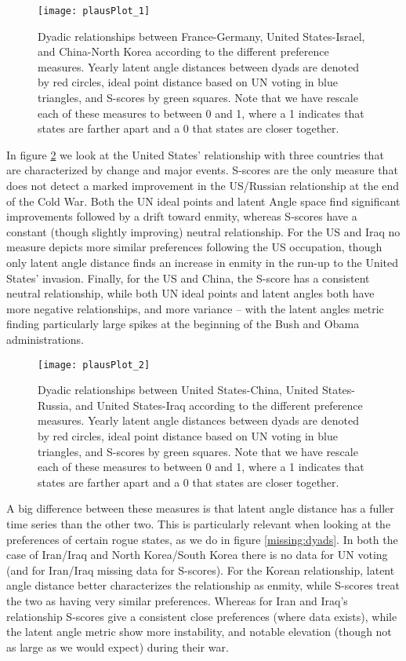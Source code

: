 \begin{figure}
	\centering
	\texttt{[image: plausPlot\_1]}
	\caption{Dyadic relationships between France-Germany, United States-Israel, and China-North Korea according to the different preference measures. Yearly latent angle distances between dyads are denoted by red circles, ideal point distance based on UN voting in blue triangles, and S-scores by green squares. Note that we have rescale each of these measures to between 0 and 1, where a 1 indicates that states are farther apart and a 0 that states are closer together.}
	\label{friendly:dyads}
\end{figure}

In figure \ref{unfriendly:dyads} we look at the United States' relationship with three countries that are characterized by change and major events. S-scores are the only measure that does not detect a marked improvement in the US/Russian relationship at the end of the Cold War. Both the UN ideal points and latent Angle space find significant improvements followed by a drift toward enmity, whereas S-scores have a constant (though slightly improving) neutral relationship. For the US and Iraq no measure depicts more similar preferences following the US occupation, though only latent angle distance finds an increase in enmity in the run-up to the United States' invasion. Finally, for the US and China, the S-score has a consistent neutral relationship, while both UN ideal points and latent angles both have more negative relationships, and more variance -- with the latent angles metric finding particularly large spikes at the beginning of the Bush and Obama administrations.

\begin{figure}
	\centering
	\texttt{[image: plausPlot\_2]}
	\caption{Dyadic relationships between United States-China, United States-Russia, and United States-Iraq according to the different preference measures. Yearly latent angle distances between dyads are denoted by red circles, ideal point distance based on UN voting in blue triangles, and S-scores by green squares. Note that we have rescale each of these measures to between 0 and 1, where a 1 indicates that states are farther apart and a 0 that states are closer together.}
	\label{unfriendly:dyads}
\end{figure}

A big difference between these measures is that latent angle distance has a fuller time series than the other two. This is particularly relevant when looking at the preferences of certain rogue states, as we do in figure \ref{missing:dyads}. In both the case of Iran/Iraq and North Korea/South Korea there is no data for UN voting (and for Iran/Iraq missing data for S-scores). For the Korean relationship, latent angle distance better characterizes the relationship as enmity, while S-scores treat the two as having very similar preferences. Whereas for Iran and Iraq's relationship S-scores give a consistent close preferences (where data exists), while the latent angle metric show more instability, and notable elevation (though not as large as we would expect) during their war.

